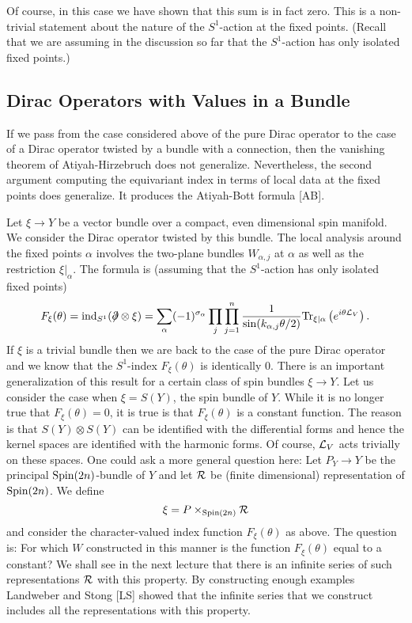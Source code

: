 Of course, in this case we have shown that this sum is in fact zero.
This  is a non-trivial statement about the nature of the $S^1$-action
at the fixed points.
(Recall that we are assuming in the discussion so far that the
$S^1$-action has only isolated fixed points.)




\subsection{Dirac Operators with Values in  a Bundle}


If we pass from the case considered above of the pure Dirac operator
to the case of a Dirac operator twisted by a bundle with a connection,
then the vanishing theorem of Atiyah-Hirzebruch does not generalize.
Nevertheless, the second argument computing the equivariant index in
terms of local data at the fixed points does generalize. It produces
the Atiyah-Bott formula [AB].

Let $\xi\to Y$ be a vector bundle over a compact, even dimensional
spin manifold. We consider the Dirac operator twisted by this bundle.
The local analysis around the fixed points $\alpha$
involves the two-plane bundles
$W_{\alpha, j}$ at $\alpha$ as well as the restriction  $\xi|_{\alpha}$. 
The formula is (assuming that the $S^1$-action has only isolated fixed
points) 
$$F_\xi(\theta)={\rm ind}_{S^1}(\dirac\otimes
\xi)=\sum_{\alpha}(-1)^{\sigma_\alpha} \prod_j
\prod_{j=1}^n\frac{1}{{\rm
sin}(k_{\alpha,j}\theta/2)}{\rm Tr}_{\xi|\alpha}\left(e^{i\theta{\cal
L}_V}\right).$$ 
If $\xi$ is a trivial bundle then we are back to the case of the pure
Dirac operator and we know that the $S^1$-index $F_\xi(\theta)$ is
identically
$0$. There is an important generalization of this result for a certain
class of spin bundles $\xi\to Y$.
Let us consider the case when 
$\xi= S(Y)$, the spin bundle of $Y$.  While  it is no longer true that 
$F_\xi(\theta)=0$, it is true is that
$F_\xi(\theta)$ is a constant function.  The reason is that
$S(Y)\otimes S(Y)$
can be identified with the differential forms and hence the kernel
spaces are identified with the harmonic forms. Of course, ${\cal L}_V$
acts trivially on these spaces. 
One could ask a more general question here:  Let $P_Y\to Y$ be the
principal ${\rm Spin}(2n)$-bundle of $Y$ and let ${\cal R}$ be (finite
dimensional) representation of ${\rm Spin}(2n)$.  We define
$$\xi=P \times_{{\rm Spin}(2n)} {\cal R}$$
and consider the character-valued index function $F_\xi(\theta)$ as
above.
The question is:
For which $W$ constructed in this manner is the function $F_\xi(\theta)$
equal to a constant? We shall see in the next lecture that there is an
infinite series of such representations ${\cal R}$ with this
property. By constructing enough examples Landweber and Stong [LS]
showed that the infinite series that we construct includes all the
representations with this property.

